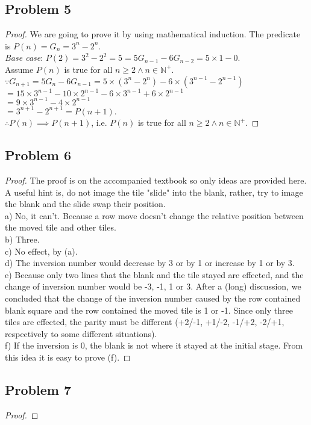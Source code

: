 \documentclass{article}
\begin{document}
\subsection{Problem 5}
\begin{proof}
We are going to prove it by using mathematical induction. The predicate is $P(n)=G_n=3^n - 2^n$.
\\ \textit{Base case}: $P(2) = 3^2 - 2^2 = 5 = 5G_{n-1} - 6G_{n-2} = 5 \times 1 - 0$.
\\ Assume $P(n)$ is true for all $n \geq 2 \wedge n \in \mathbb{N}^+$.
\\ $ \because G_{n+1} = 5G_{n} - 6G_{n-1} = 5 \times (3^n - 2^n) - 6 \times (3^{n-1} - 2^{n-1})$
\\ $ = 15 \times 3^{n-1} - 10 \times 2^{n-1} - 6 \times 3^{n-1} + 6 \times 2^{n-1}
$
\\ $ = 9 \times 3^{n-1} - 4 \times 2^{n-1} $
\\ $ = 3^{n + 1} - 2^{n + 1} = P(n+1)$.
\\ $ \therefore P(n) \implies P(n+1)$, i.e. $P(n)$ is true for all $n \geq 2 \wedge n \in \mathbb{N}^+$.
\end{proof}
\subsection{Problem 6}
\begin{proof} The proof is on the accompanied textbook so only ideas are provided here. A useful hint is, do not image the tile "slide" into the blank, rather, try to image the blank and the slide swap their position.
\\ a) No, it can't. Because a row move doesn't change the relative position between the moved tile and other tiles.
\\ b) Three.
\\ c) No effect, by (a).
\\ d) The inversion number would decrease by 3 or by 1 or increase by 1 or by 3.
\\ e) Because only two lines that the blank and the tile stayed are effected, and the change of inversion number would be -3, -1, 1 or 3. After a (long) discussion, we concluded that the change of the inversion number caused by the row contained blank square and the row contained the moved tile is 1 or -1. Since only three tiles are effected, the parity must be different (+2/-1, +1/-2, -1/+2, -2/+1, respectively to some different situations).
\\ f) If the inversion is 0, the blank is not where it stayed at the initial stage. From this idea it is easy to prove (f).
\end{proof}
\subsection{Problem 7}
\begin{proof}

\end{proof}
\end{document}
